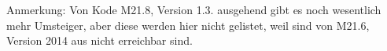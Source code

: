 Anmerkung: Von Kode M21.8, Version 1.3. ausgehend gibt es noch wesentlich mehr Umsteiger, aber diese werden hier nicht gelistet, weil sind von M21.6, Version 2014 aus nicht erreichbar sind. 

